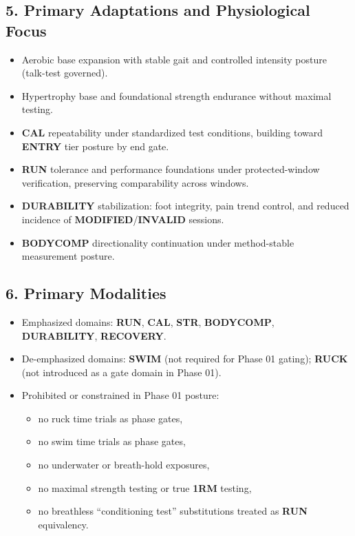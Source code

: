 \documentclass[10pt]{article}
\begin{document}
\subsection*{5. Primary Adaptations and Physiological Focus}

\begin{itemize}
\item Aerobic base expansion with stable gait and controlled intensity posture (talk-test governed).
\item Hypertrophy base and foundational strength endurance without maximal testing.
\item \textbf{CAL} repeatability under standardized test conditions, building toward \textbf{ENTRY} tier posture by end gate.
\item \textbf{RUN} tolerance and performance foundations under protected-window verification, preserving comparability across windows.
\item \textbf{DURABILITY} stabilization: foot integrity, pain trend control, and reduced incidence of \textbf{MODIFIED}/\textbf{INVALID} sessions.
\item \textbf{BODYCOMP} directionality continuation under method-stable measurement posture.
\end{itemize}

\subsection*{6. Primary Modalities}

\begin{itemize}
\item Emphasized domains: \textbf{RUN}, \textbf{CAL}, \textbf{STR}, \textbf{BODYCOMP}, \textbf{DURABILITY}, \textbf{RECOVERY}.
\item De-emphasized domains: \textbf{SWIM} (not required for Phase 01 gating); \textbf{RUCK} (not introduced as a gate domain in Phase 01).
\item Prohibited or constrained in Phase 01 posture:
\begin{itemize}
\item no ruck time trials as phase gates,
\item no swim time trials as phase gates,
\item no underwater or breath-hold exposures,
\item no maximal strength testing or true \textbf{1RM} testing,
\item no breathless “conditioning test” substitutions treated as \textbf{RUN} equivalency.
\end{itemize}
\end{itemize}
\end{document}
